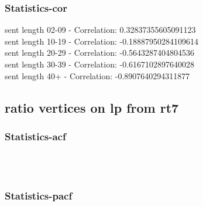 \documentclass{article}%
\begin{document}
%
\newpage%
\subsubsection{Statistics{-}cor}%
\label{ssubsec:Statistics{-}cor}%
\noindent%
sent length 02-09 - Correlation: 0.32837355605091123\\%
sent length 10-19 - Correlation: -0.18887950284109614\\%
sent length 20-29 - Correlation: -0.5643287404804536\\%
sent length 30-39 - Correlation: -0.6167102897640028\\%
sent length 40+ - Correlation: -0.8907640294311877\\

%
\newpage

%
\subsection{ratio vertices on lp from rt7}%
\label{subsec:ratioverticesonlpfromrt7}%
\subsubsection{Statistics{-}acf}%
\label{ssubsec:Statistics{-}acf}%


\begin{figure}[ht]%
\centering%
\setlength{\abovecaptionskip}{-35pt}%
%
%
\\%
%
%
\\%
%
\end{figure}

%
\newpage%
\subsubsection{Statistics{-}pacf}%
\label{ssubsec:Statistics{-}pacf}%
\end{document}
